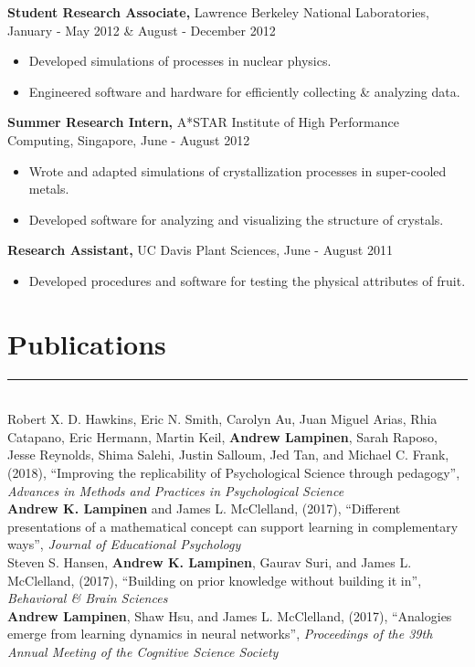 \documentclass[margin]{res}
\begin{document}
\begin{resume}
 {\bf Student Research Associate,} Lawrence Berkeley National Laboratories, January - May 2012 \& August - December 2012
\begin{itemize} \itemsep -2pt
  \item Developed simulations of processes in nuclear physics. \item Engineered software and hardware for efficiently collecting \& analyzing data. \end{itemize}\vspace{-8pt}
{\bf Summer Research Intern,} A*STAR Institute of High Performance Computing, Singapore, June - August 2012
\begin{itemize} \itemsep -2pt
  \item Wrote and adapted simulations of crystallization processes in super-cooled metals. \item Developed software for analyzing and visualizing the structure of crystals. \end{itemize}\vspace{-8pt}
{\bf Research Assistant,} UC Davis Plant Sciences, June - August 2011
 \begin{itemize} \itemsep -2pt
  \item Developed procedures and software for testing the physical attributes of fruit. \end{itemize}

\vspace{1pt}\section{Publications} \vspace{-15pt} \rule{\textwidth}{0.5pt} \\[3pt]
 Robert X. D. Hawkins, Eric N. Smith, Carolyn Au, Juan Miguel Arias, Rhia Catapano, Eric Hermann, Martin Keil, \textbf{Andrew Lampinen}, Sarah Raposo, Jesse Reynolds, Shima Salehi, Justin Salloum, Jed Tan, and Michael C. Frank, (2018), {``Improving the replicability of Psychological Science through pedagogy''},  \textit{Advances in Methods and Practices in Psychological Science} \\ [3pt]
\textbf{Andrew K. Lampinen} and James L. McClelland, (2017), {``Different presentations of a mathematical concept can support learning in complementary ways''}, \textit{Journal of Educational Psychology} \\[3pt]
Steven S. Hansen, \textbf{Andrew K. Lampinen}, Gaurav Suri, and James L. McClelland, (2017), {``Building on prior knowledge without building it in''}, \textit{Behavioral \& Brain Sciences}  \\[3pt]
\textbf{Andrew Lampinen}, Shaw Hsu, and James L. McClelland, (2017), {``Analogies emerge from learning dynamics in neural networks''}, \textit{Proceedings of the 39th Annual Meeting of the Cognitive Science Society}  


\end{resume}
\end{document}
